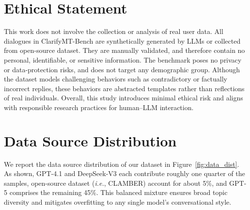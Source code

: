 \documentclass[sigconf]{acmart}
\begin{document}
\section{Ethical Statement }

This work does not involve the collection or analysis of real user data. All dialogues in ClarifyMT-Bench are synthetically generated by LLMs or collected from open-source dataset. They are manually validated, and therefore contain no personal, identifiable, or sensitive information. The benchmark poses no privacy or data-protection risks, and does not target any demographic group. Although the dataset models challenging behaviors such as contradictory or factually incorrect replies, these behaviors are abstracted templates rather than reflections of real individuals. Overall, this study introduces minimal ethical risk and aligns with responsible research practices for human–LLM interaction.




\section{Data Source Distribution}
\label{sec:adddata}

We report the data source distribution of our dataset in Figure~\ref{fig:data_dist}. As shown, GPT-4.1 and DeepSeek-V3 each contribute roughly one quarter of the samples, open-source dataset (\textit{i.e.}, CLAMBER) account for about 5\%, and GPT-5 comprises the remaining 45\%. This balanced mixture ensures broad topic diversity and mitigates overfitting to any single model’s conversational style.



\end{document}
